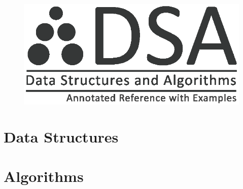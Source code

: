 \documentclass[10pt,oneside,a4paper]{report}
\begin{document}
\begin{figure}
\begin{center}
\includegraphics{dsa_logo}
\end{center}
\end{figure}
\title{}
\author{Granville Barnett\\Luca Del Tongo}
\maketitle

\newpage
\tableofcontents
\newpage

\pagestyle{headings}




\part{Data Structures}







\part{Algorithms}






\appendix


\end{document}
